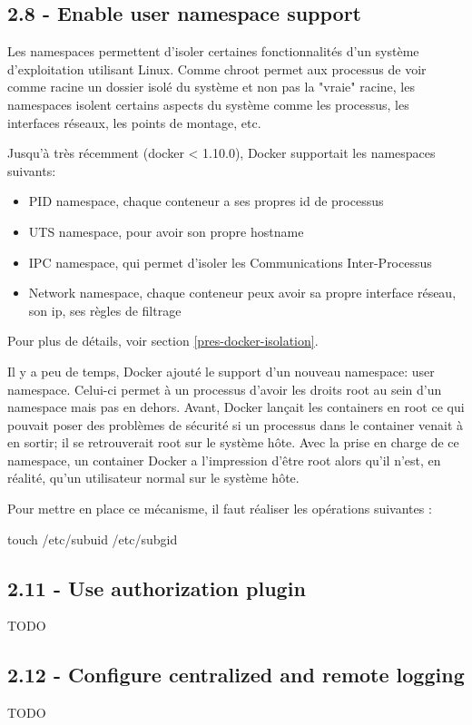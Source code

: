 \documentclass[11pt,a4paper,oneside]{report}
\begin{document}
\subsection{2.8 - Enable user namespace support}
Les namespaces permettent d'isoler certaines fonctionnalités d'un système d'exploitation utilisant Linux. Comme chroot permet aux processus de voir comme racine un dossier isolé du système et non pas la "vraie" racine, les namespaces isolent certains aspects du système comme les processus, les interfaces réseaux, les points de montage, etc.

Jusqu'à très récemment (docker < 1.10.0), Docker supportait les namespaces suivants:
\begin{itemize}
\item PID namespace, chaque conteneur a ses propres id de processus
\item UTS namespace, pour avoir son propre hostname
\item IPC namespace, qui permet d'isoler les Communications Inter-Processus
\item Network namespace, chaque conteneur peux avoir sa propre interface réseau, son ip, ses règles de filtrage
\end{itemize}

Pour plus de détails, voir section \ref{pres-docker-isolation}.

Il y a peu de temps, Docker ajouté le support d'un nouveau namespace\cite{docker_1_10_user_namespace}: user namespace. Celui-ci permet à un processus d'avoir les droits root au sein d'un namespace mais pas en dehors. Avant, Docker lançait les containers en root ce qui pouvait poser des problèmes de sécurité si un processus dans le container venait à en sortir; il se retrouverait root sur le système hôte. Avec la prise en charge de ce namespace, un container Docker a l'impression d'être root alors qu'il n'est, en réalité, qu'un utilisateur normal sur le système hôte.

Pour mettre en place ce mécanisme, il faut réaliser les opérations suivantes :

\begin{bashcode}
touch /etc/subuid /etc/subgid 
\end{bashcode}


\subsection{2.11 - Use authorization plugin}
TODO


\subsection{2.12 - Configure centralized and remote logging}
TODO
\end{document}
